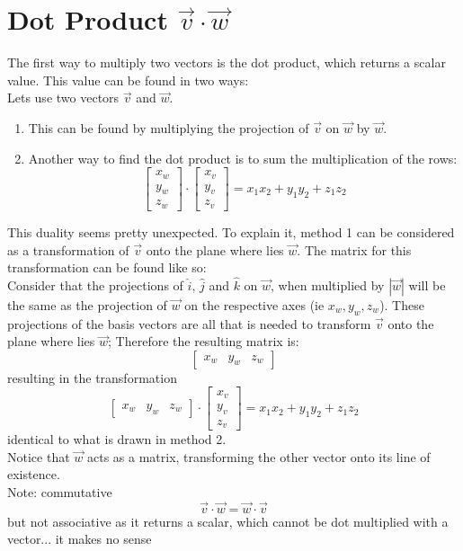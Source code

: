 \documentclass{article}
\begin{document}
\section{Dot Product $\vec{v}\cdot\vec{w}$}
The first way to multiply two vectors is the dot product, which returns a scalar value. This value can be found in two ways:\\
Lets use two vectors $\vec{v}$ and $\vec{w}$.\\
\begin{enumerate}
    \item 
This can be found by multiplying the projection of $\vec{v}$ on $\vec{w}$ by $\vec{w}$.\\
    \item
Another way to find the dot product is to sum the multiplication of the rows:
\[\begin{bmatrix}
    x_{w}\\
    y_{w}\\
    z_{w}
\end{bmatrix} \cdot \begin{bmatrix}
    x_{v}\\
    y_{v}\\
    z_{v}
\end{bmatrix} = x_{1}x_{2} + y_{1}y_{2} + z_{1}z_{2}
\]
\end{enumerate}
This duality seems pretty unexpected. To explain it, method 1 can be considered as a transformation of $\vec{v}$ onto the plane where lies $\vec{w}$. The matrix for this transformation can be found like so:\\
Consider that the projections of $\hat{i}$, $\hat{j}$ and $\hat{k}$ on $\vec{w}$, when multiplied by $|\vec{w}|$ will be the same as the projection of $\vec{w}$ on the respective axes (ie $x_{w}, y_{w}, z_{w}$). These projections of the basis vectors are all that is needed to transform $\vec{v}$ onto the plane where lies $\vec{w}$; Therefore the resulting matrix is:
\[\begin{bmatrix}
    x_{w}& y_{w}& z_{w}
\end{bmatrix}
\]
resulting in the transformation
\[\begin{bmatrix}
    x_{w}& y_{w}& z_{w}
\end{bmatrix}\cdot\begin{bmatrix}
    x_{v}\\
    y_{v}\\
    z_{v}
\end{bmatrix} = x_{1}x_{2} + y_{1}y_{2} + z_{1}z_{2}\]
identical to what is drawn in method 2.\\
Notice that $\vec{w}$ acts as a matrix, transforming the other vector onto its line of existence.
\\ Note: commutative
\[\vec{v} \cdot \vec{w} = \vec{w} \cdot \vec{v}
\]
but not associative as it returns a scalar, which cannot be dot multiplied with a vector... it makes no sense
\end{document}
